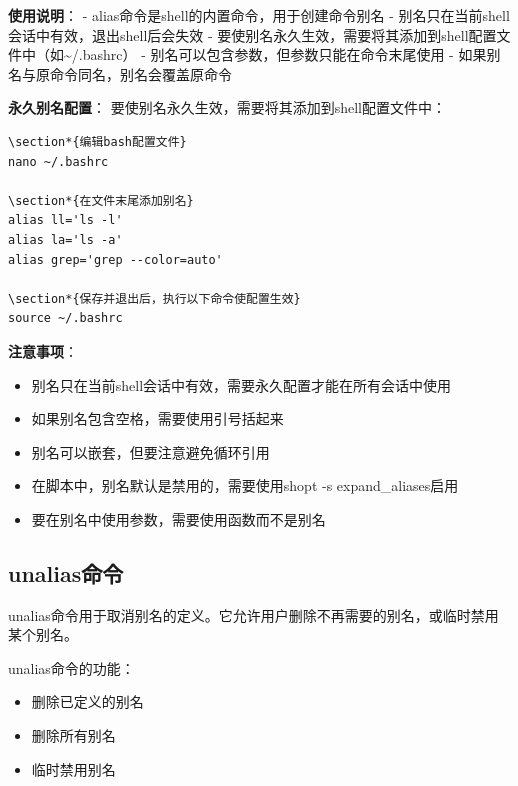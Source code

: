 \documentclass[12pt,UTF8]{ctexbook}
\begin{document}
\textbf{使用说明}：
- alias命令是shell的内置命令，用于创建命令别名
- 别名只在当前shell会话中有效，退出shell后会失效
- 要使别名永久生效，需要将其添加到shell配置文件中（如\textasciitilde/.bashrc）
- 别名可以包含参数，但参数只能在命令末尾使用
- 如果别名与原命令同名，别名会覆盖原命令

\textbf{永久别名配置}：
要使别名永久生效，需要将其添加到shell配置文件中：

\begin{verbatim}
\section*{编辑bash配置文件}
nano ~/.bashrc

\section*{在文件末尾添加别名}
alias ll='ls -l'
alias la='ls -a'
alias grep='grep --color=auto'

\section*{保存并退出后，执行以下命令使配置生效}
source ~/.bashrc
\end{verbatim}

\textbf{注意事项}：
\begin{itemize}
    \item 别名只在当前shell会话中有效，需要永久配置才能在所有会话中使用
    \item 如果别名包含空格，需要使用引号括起来
    \item 别名可以嵌套，但要注意避免循环引用
    \item 在脚本中，别名默认是禁用的，需要使用shopt -s expand\_aliases启用
    \item 要在别名中使用参数，需要使用函数而不是别名
\end{itemize}

\subsection{unalias命令}
unalias命令用于取消别名的定义。它允许用户删除不再需要的别名，或临时禁用某个别名。

unalias命令的功能：
\begin{itemize}
    \item 删除已定义的别名
    \item 删除所有别名
    \item 临时禁用别名
\end{itemize}
\end{document}
